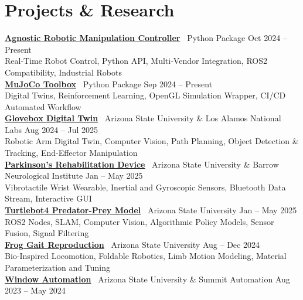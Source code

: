 \documentclass[10pt]{article}
\begin{document}
\section*{Projects \& Research}
\textbf{\href{https://github.com/MGross21/armctl}{Agnostic Robotic Manipulation Controller}} \textbar\ Python Package \hfill Oct 2024 -- Present \\
\hspace*{2em}Real-Time Robot Control, Python API, Multi-Vendor Integration, ROS2 Compatibility, Industrial Robots
\\
\textbf{\href{https://github.com/MGross21/mujoco-toolbox}{MuJoCo Toolbox}} \textbar\ Python Package \hfill Sep 2024 -- Present \\
\hspace*{2em}Digital Twins, Reinforcement Learning, OpenGL Simulation Wrapper, CI/CD Automated Workflow
\\
\textbf{\href{https://github.com/MGross21/glovebox-digitaltwin}{Glovebox Digital Twin}} \textbar\ Arizona State University \& Los Alamos National Labs  \hfill Aug 2024 -- Jul 2025 \\
\hspace*{2em}Robotic Arm Digital Twin, Computer Vision, Path Planning, Object Detection \& Tracking, End-Effector Manipulation
\\
\textbf{\href{https://github.com/MGross21/syncstride-wearable}{Parkinson's Rehabilitation Device}} \textbar\ Arizona State University \& Barrow Neurological Institute \hfill Jan -- May 2025 \\
\hspace*{2em}Vibrotactile Wrist Wearable, Inertial and Gyroscopic Sensors, Bluetooth Data Stream, Interactive GUI
\\
\textbf{\href{https://ASU-RAS598-2025-S-TEAM02.github.io}{Turtlebot4 Predator-Prey Model}} \textbar\ Arizona State University \hfill Jan -- May 2025 \\
\hspace*{2em}ROS2 Nodes, SLAM, Computer Vision, Algorithmic Policy Models, Sensor Fusion, Signal Filtering
\\
\textbf{\href{https://github.com/MGross21/Robotic-Jumping-Frog}{Frog Gait Reproduction}} \textbar\ Arizona State University \hfill Aug -- Dec 2024 \\
\hspace*{2em}Bio-Inspired Locomotion, Foldable Robotics, Limb Motion Modeling, Material Parameterization and Tuning
\\
\textbf{\href{https://www.linkedin.com/posts/mhgross_asu-innovationshowcase-capstoneproject-activity-7192395158401765376-nWLz}{Window Automation}} \textbar\ Arizona State University \& Summit Automation \hfill Aug 2023 -- May 2024 \\
\end{document}

